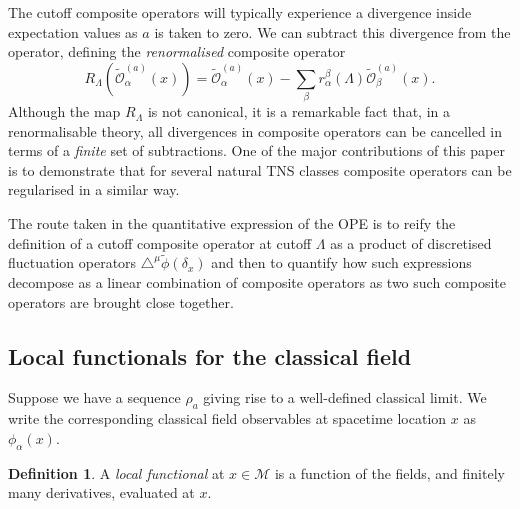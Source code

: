 \documentclass[prl,twocolumn,lengthcheck,superscriptaddress]{revtex4-1}
\theoremstyle{definition}
\newtheorem{definition}{Definition}
\theoremstyle{remark}
\begin{document}
The cutoff composite operators will typically experience a divergence inside expectation values as $a$ is taken to zero. We can subtract this divergence from the operator, defining the \emph{renormalised} composite operator
\begin{equation}
	R_\Lambda(\widetilde{\mathcal{O}}^{(a)}_\alpha(x)) = \widetilde{\mathcal{O}}^{(a)}_\alpha(x) - \sum_{\beta} r_\alpha^\beta(\Lambda) \widetilde{\mathcal{O}}^{(a)}_\beta(x).
\end{equation}
Although the map $R_\Lambda$ is not canonical, it is a remarkable fact that, in a renormalisable theory, all divergences in composite operators can be cancelled in terms of a \emph{finite} set of subtractions. One of the major contributions of this paper is to demonstrate that for several natural TNS classes composite operators can be regularised in a similar way.

The route taken in the quantitative expression of the OPE is to reify the definition of a cutoff composite operator at cutoff $\Lambda$ as a product of discretised fluctuation operators $\triangle^\mu \widetilde{\phi}(\delta_x)$ and then to quantify how such expressions decompose as a linear combination of composite operators as two such composite operators are brought close together. 

\subsection{Local functionals for the classical field}
Suppose we have a sequence $\rho_a$ giving rise to a well-defined classical limit. We write the corresponding classical field observables at spacetime location $x$ as $\phi_\alpha(x)$. 
\begin{definition}
	A \emph{local functional} at $x\in \mathcal{M}$ is a function of the fields, and finitely many derivatives, evaluated at $x$.
\end{definition}
\end{document}
